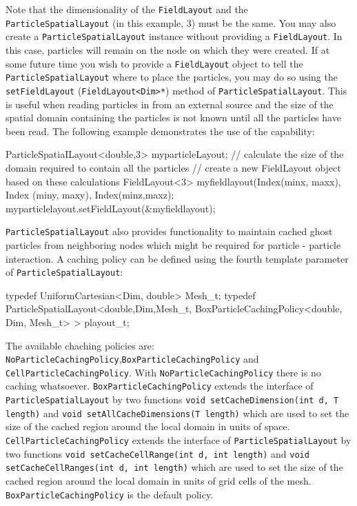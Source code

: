 Note that the dimensionality of the \texttt{FieldLayout} and the \texttt{ParticleSpatialLayout} (in this example, 3) must be the same. You may also create a \texttt{ParticleSpatialLayout} instance without providing a \texttt{FieldLayout}. In this case, particles will remain on the node on which they were created. If at some future time you wish to provide a \texttt{FieldLayout} object to tell the \texttt{ParticleSpatialLayout} where to place the particles, you may do so using the \texttt{setFieldLayout} (\texttt{FieldLayout<Dim>*}) method of \texttt{ParticleSpatialLayout}. This is useful when reading particles in from an external source and the size of the spatial domain containing the particles is not known until all the particles have been read. The following example demonstrates the use of the capability:
\begin{smallcode}
ParticleSpatiaILayout<double,3> myparticleLayout; 
// calculate the size of the domain required to contain all the particles 
// create a new FieldLayout object based on these calculations 
FieldLayout<3> myfieldlayout(Index(minx, maxx), Index (miny, maxy), 
                             Index(minz,maxz);   
myparticlelayout.setFieldLayout(&myfieldlayout);
\end{smallcode}

\texttt{ParticleSpatialLayout} also provides functionality to maintain cached ghost particles from neighboring nodes which might be required for particle - particle interaction. A caching policy can be defined using the fourth template parameter of \texttt{ParticleSpatialLayout}:
\begin{smallcode}
typedef UniformCartesian<Dim, double> Mesh_t;
typedef ParticleSpatialLayout<double,Dim,Mesh_t,
        BoxParticleCachingPolicy<double, Dim, Mesh_t> > playout_t;
\end{smallcode}
The available chaching policies are: \texttt{NoParticleCachingPolicy},\texttt{BoxParticleCachingPolicy} and \texttt{CellParticleCachingPolicy}. With \texttt{NoParticleCachingPolicy} there is no caching whatsoever. \texttt{BoxParticleCachingPolicy} extends the interface of \texttt{ParticleSpatialLayout} by two functions \texttt{void setCacheDimension(int d, T length)} and \texttt{void setAllCacheDimensions(T length)} which are used to set the size of the cached region around the local domain in units of space. \texttt{CellParticleCachingPolicy} extends the interface of \texttt{ParticleSpatialLayout} by two functions \texttt{void setCacheCellRange(int d, int length)} and \texttt{void setCacheCellRanges(int d, int length)} which are used to set the size of the cached region around the local domain in units of grid cells of the mesh. \texttt{BoxParticleCachingPolicy} is the default policy.

